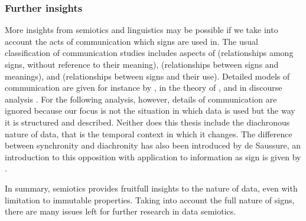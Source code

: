

\subsubsection{Further insights}

More insights from semiotics and linguistics may be possible if we take into
account the acts of communication which signs are used in. The usual
classification of communication studies includes aspects of 
(relationships among signs, without reference to their meaning),
 (relationships between signs and meanings), and
 (relationships between signs and their use). Detailed models
of communication are given for instance by \textcite{Jakobson1963}, in the
theory of  \cite{Austin1962,Searle1969}, and in discourse
analysis \cite{Foucault1969}. For the following analysis, however, details of
communication are ignored because our focus is not the situation in which data
is used but the way it is structured and described. Neither does this thesis
include the diachronous nature of data, that is the temporal context in which
it changes. The difference between synchronity and diachronity has also been
introduced by de Saussure, an introduction to this opposition with
application to information as sign is given by \textcite{Raber2003}.

In summary, semiotics provides fruitfull insights to the nature of data, even
with limitation to immutable properties. Taking into account the full nature 
of signs, there are many issues left for further research in data semiotics.

